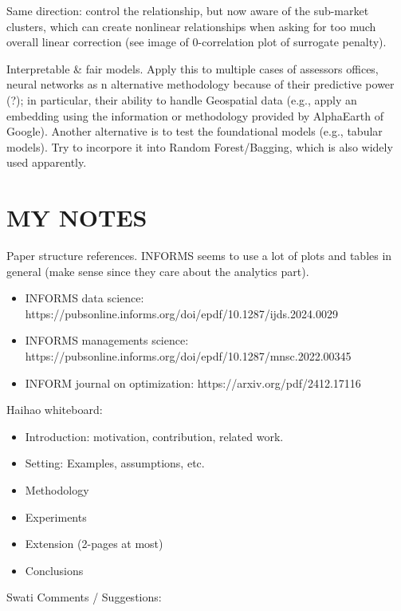 \documentclass[12pt, draft]{article}
\theoremstyle{plain}
\theoremstyle{definition}
\newcommand{\1}{\mathbf{1}}
\begin{document}
Same direction: control the relationship, but now aware of the sub-market clusters, which can create nonlinear relationships when asking for too much overall linear correction (see image of 0-correlation plot of surrogate penalty).

Interpretable \& fair models. Apply this to multiple cases of assessors offices, neural networks as n alternative methodology because of their predictive power (?); in particular, their ability to handle Geospatial data (e.g., apply an embedding using the information or methodology provided by AlphaEarth of Google). Another alternative is to test the foundational models (e.g., tabular models). Try to incorpore it into Random Forest/Bagging, which is also widely used apparently.

\section{MY NOTES}

Paper structure references. INFORMS seems to use a lot of plots and tables in general (make sense since they care about the analytics part).
\begin{itemize}
    \item INFORMS data science: https://pubsonline.informs.org/doi/epdf/10.1287/ijds.2024.0029
    \item INFORMS managements science: https://pubsonline.informs.org/doi/epdf/10.1287/mnsc.2022.00345
    \item INFORM journal on optimization: https://arxiv.org/pdf/2412.17116
\end{itemize}

\noindent Haihao whiteboard:
\begin{itemize}
    \item Introduction: motivation, contribution, related work.
    \item Setting: Examples, assumptions, etc.
    \item Methodology
    \item Experiments
    \item Extension (2-pages at most)
    \item Conclusions
\end{itemize}

\noindent Swati Comments / Suggestions:
\end{document}
